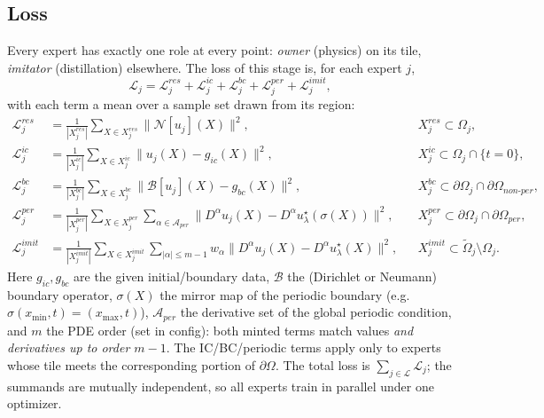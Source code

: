 \documentclass[11pt]{article}
\begin{document}
\subsection*{Loss}
Every expert has exactly one role at every point: \emph{owner}
(physics) on its tile, \emph{imitator} (distillation) elsewhere. The
loss of this stage is, for each expert $j$,
\begin{equation}
\mathcal L_j
= \mathcal L^{res}_j + \mathcal L^{ic}_j + \mathcal L^{bc}_j
+ \mathcal L^{per}_j + \mathcal L^{imit}_j ,
\label{eq:loss}
\end{equation}
with each term a mean over a sample set drawn from its region:
\begin{align}
\mathcal L^{res}_j
&= \frac{1}{|X^{res}_j|} \sum_{X \in X^{res}_j}
   \bigl\| \mathcal N[u_j](X) \bigr\|^2 ,
&& X^{res}_j \subset \Omega_j ,
\label{eq:term_res}\\
\mathcal L^{ic}_j
&= \frac{1}{|X^{ic}_j|} \sum_{X \in X^{ic}_j}
   \bigl\| u_j(X) - g_{ic}(X) \bigr\|^2 ,
&& X^{ic}_j \subset \Omega_j \cap \{t = 0\} ,
\label{eq:term_ic}\\
\mathcal L^{bc}_j
&= \frac{1}{|X^{bc}_j|} \sum_{X \in X^{bc}_j}
   \bigl\| \mathcal B[u_j](X) - g_{bc}(X) \bigr\|^2 ,
&& X^{bc}_j \subset \partial\Omega_j \cap \partial\Omega_{non\text{-}per} ,
\label{eq:term_bc}\\
\mathcal L^{per}_j
&= \frac{1}{|X^{per}_j|} \sum_{X \in X^{per}_j}
   \sum_{\alpha \in \mathcal A_{per}}
   \bigl\| D^\alpha u_j(X) - D^\alpha u^\star_\lambda(\sigma(X))
   \bigr\|^2 ,
&& X^{per}_j \subset \partial\Omega_j \cap \partial\Omega_{per} ,
\label{eq:term_per}\\
\mathcal L^{imit}_j
&= \frac{1}{|X^{imit}_j|} \sum_{X \in X^{imit}_j}
   \sum_{|\alpha| \le m-1} w_\alpha
   \bigl\| D^\alpha u_j(X) - D^\alpha u^\star_\lambda(X) \bigr\|^2 ,
&& X^{imit}_j \subset \widetilde\Omega_j \setminus \Omega_j .
\label{eq:term_imit}
\end{align}
Here $g_{ic}, g_{bc}$ are the given initial/boundary data,
$\mathcal B$ the (Dirichlet or Neumann) boundary operator,
$\sigma(X)$ the mirror map of the periodic boundary
(e.g.\ $\sigma(x_{\min},t) = (x_{\max},t)$),
$\mathcal A_{per}$ the derivative set of the global periodic condition,
and $m$ the PDE order (set in config): both minted terms match values
\emph{and derivatives up to order $m-1$}. The IC/BC/periodic terms apply
only to experts whose tile meets the corresponding portion of
$\partial\Omega$. The total loss is
$\sum_{j\in\mathcal L} \mathcal L_j$; the summands are mutually
independent, so all experts train in parallel under one optimizer.
\end{document}
